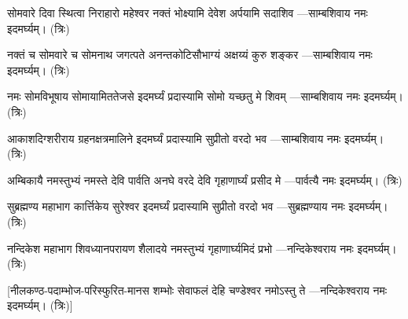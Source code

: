 

\twolineshloka
{सोमवारे दिवा स्थित्वा निराहारो महेश्वर}
{नक्तं भोक्ष्यामि देवेश अर्पयामि सदाशिव}
\nobreak\hfill{}---साम्बशिवाय नमः इदमर्घ्यम्। (त्रिः)

\twolineshloka
{नक्तं च सोमवारे च सोमनाथ जगत्पते}
{अनन्तकोटिसौभाग्यं अक्षय्यं कुरु शङ्कर }
\nobreak\hfill{}---साम्बशिवाय नमः इदमर्घ्यम्। (त्रिः)

\twolineshloka
{नमः सोमविभूषाय सोमायामिततेजसे}
{इदमर्घ्यं प्रदास्यामि सोमो यच्छतु मे शिवम्}
\nobreak\hfill{}---साम्बशिवाय नमः इदमर्घ्यम्। (त्रिः)

\twolineshloka
{आकाशदिग्शरीराय ग्रहनक्षत्रमालिने}
{इदमर्घ्यं प्रदास्यामि सुप्रीतो वरदो भव}
\nobreak\hfill{}---साम्बशिवाय नमः इदमर्घ्यम्। (त्रिः)


\twolineshloka
{अम्बिकायै नमस्तुभ्यं नमस्ते देवि पार्वति}
{अनघे वरदे देवि गृहाणार्घ्यं प्रसीद मे}
\nobreak\hfill{}---पार्वत्यै नमः इदमर्घ्यम्। (त्रिः)


\twolineshloka
{सुब्रह्मण्य महाभाग कार्त्तिकेय सुरेश्वर}
{इदमर्घ्यं प्रदास्यामि सुप्रीतो वरदो भव}
\nobreak\hfill{}---सुब्रह्मण्याय नमः इदमर्घ्यम्। (त्रिः)

\twolineshloka
{नन्दिकेश महाभाग शिवध्यानपरायण}
{शैलादये नमस्तुभ्यं गृहाणार्घ्यमिदं प्रभो}
\nobreak\hfill{}---नन्दिकेश्वराय नमः इदमर्घ्यम्। (त्रिः)

\twolineshloka
{[नीलकण्ठ-पदाम्भोज-परिस्फुरित-मानस}
{शम्भोः सेवाफलं देहि चण्डेश्वर नमोऽस्तु ते}
\nobreak\hfill{}---नन्दिकेश्वराय नमः इदमर्घ्यम्। (त्रिः)]


